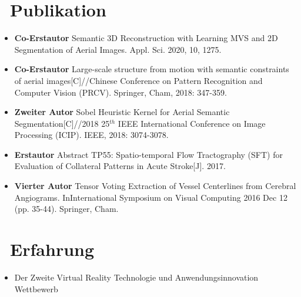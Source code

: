 \documentclass{resume}
\begin{document}
\section{\faBookmark\ Publikation}
\begin{itemize} \small
    \item \textbf{Co-Erstautor} Semantic 3D Reconstruction with Learning MVS and 2D Segmentation of Aerial Images. Appl. Sci. 2020, 10, 1275.
    \item \textbf{Co-Erstautor} Large-scale structure from motion with semantic constraints of aerial images[C]//Chinese Conference on Pattern Recognition and Computer Vision (PRCV). Springer, Cham, 2018: 347-359.
	\item \textbf{Zweiter Autor} Sobel Heuristic Kernel for Aerial Semantic Segmentation[C]//2018 25$^{th}$ IEEE International Conference on Image Processing (ICIP). IEEE, 2018: 3074-3078.
	\item \textbf{Erstautor} Abstract TP55: Spatio-temporal Flow Tractography (SFT) for Evaluation of Collateral Patterns in Acute Stroke[J]. 2017.
	\item \textbf{Vierter Autor} Tensor Voting Extraction of Vessel Centerlines from Cerebral Angiograms. InInternational Symposium on Visual Computing 2016 Dec 12 (pp. 35-44). Springer, Cham.
\end{itemize}


\section{\faHeartO\ Erfahrung}

\begin{itemize}
	\item Der Zweite Virtual Reality Technologie und Anwendungsinnovation Wettbewerb
\end{itemize}

\end{document}
